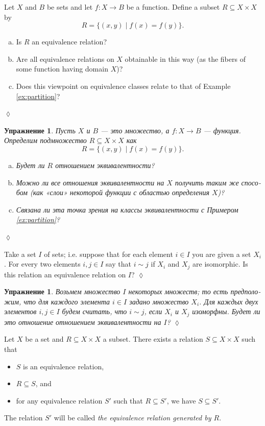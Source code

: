 \documentclass[a4paper]{book}
\def\to{\rightarrow}
\def\taking{\colon}
\def\ss{\subseteq}
\def\|{{\;|\;}}
\theoremstyle{myth}
\newtheorem{lemmaENG}[envENG]{\begin{english}Lemma\end{english}}
\newtheorem{excENG}[envENG]{\begin{english}Exercise\end{english}}
\newenvironment{exerciseENG}{\begin{excENG}}{\hspace*{\fill}$\lozenge$\end{excENG}}
\newtheorem{excRUS}[envRUS]{Упражнение}
\newenvironment{exerciseRUS}{\begin{excRUS}}{\hspace*{\fill}$\lozenge$\end{excRUS}}
\def\sexc{\begin{enumerate}[a.)]\setlength{\itemsep}{.1cm}\setlength{\parskip}{.1cm}\item}
\def\next{\item}
\def\endsexc{\end{enumerate}}
\begin{document}
\begin{russian}
\begin{exerciseENG}
Let $X$ and $B$ be sets and let $f\taking X\to B$ be a function. Define a subset $R\ss X\times X$ by $$R=\{(x,y)\|f(x)=f(y)\}.$$ 
\sexc Is $R$ an equivalence relation? 
\next Are all equivalence relations on $X$ obtainable in this way (as the fibers of some function having domain $X$)?
\next Does this viewpoint on equivalence classes relate to that of Example \ref{ex:partition}?
\endsexc
\end{exerciseENG}

\begin{exerciseRUS}
Пусть $X$ и $B$ — это множество, а $f\taking X\to B$ — функция. Определим подмножество $R\ss X\times X$ как $$R=\{(x,y)\|f(x)=f(y)\}.$$ 
\sexc Будет ли $R$ отношением эквивалентности? 
\next Можно ли все отношения эквивалентности на $X$ получить таким же способом (как «слои» некоторой функции с областью определения $X$)?
\next Связана ли эта точка зрения на классы эквивалентности с Примером \ref{ex:partition}?
\endsexc
\end{exerciseRUS}

\begin{exerciseENG}
Take a set $I$ of sets; i.e. suppose that for each element $i\in I$ you are given a set $X_i$. For every two elements $i,j\in I$ say that $i\sim j$ if $X_i$ and $X_j$ are isomorphic. Is this relation an equivalence relation on $I$?  
\end{exerciseENG}

\begin{exerciseRUS}
Возьмем множество $I$ некоторых множеств; то есть предположим, что для каждого элемента $i\in I$ задано множество $X_i$. Для каждых двух элементов $i,j\in I$ будем считать, что $i\sim j$, если $X_i$ и $X_j$ изоморфны. Будет ли это отношение отношением эквивалентности на $I$?
\end{exerciseRUS}

\begin{lemmaENG}\label{lemma:generating ERs}
Let $X$ be a set and $R\ss X\times X$ a subset. There exists a relation $S\ss X\times X$ such that
\begin{itemize}
\item $S$ is an equivalence relation,
\item $R\ss S$, and
\item for any equivalence relation $S'$ such that $R\ss S'$, we have $S\ss S'$.
\end{itemize}
The relation $S'$ will be called {\em the equivalence relation generated by $R$}.
\end{lemmaENG}


\end{russian}
\end{document}
